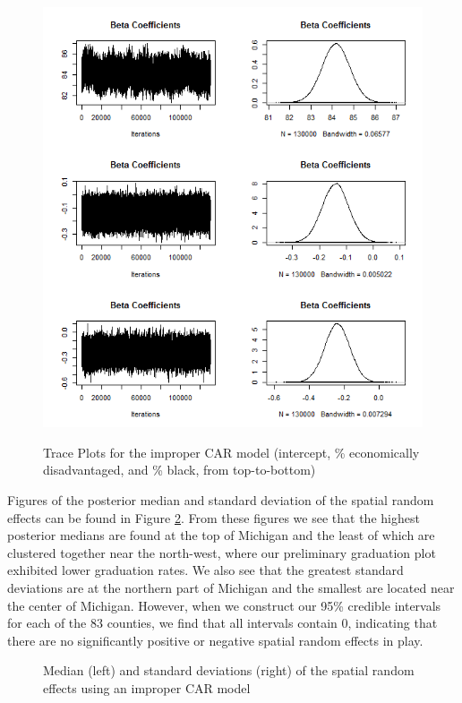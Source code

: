 \documentclass[12pt,letterpaper]{article}
\begin{document}
\begin{figure}[h!]
\caption{Trace Plots for the improper CAR model (intercept, \% economically disadvantaged, and \% black, from top-to-bottom)}
\centering
\includegraphics[scale=.9]{trace_plots.png}
\label{lab:trace_plots}
\end{figure}

Figures of the posterior median and standard deviation of the spatial random effects can be found in Figure \ref{lab:med_sd}. From these figures we see that the highest posterior medians are found at the top of Michigan and the least of which are clustered together near the north-west, where our preliminary graduation plot exhibited lower graduation rates. We also see that the greatest standard deviations are at the northern part of Michigan and the smallest are located near the center of Michigan. However, when we construct our 95\% credible intervals for each of the 83 counties, we find that all intervals contain 0, indicating that there are no significantly positive or negative spatial random effects in play.

\begin{figure}[h!]
\caption{Median (left) and standard deviations (right) of the spatial random effects using an improper CAR model}
\centering
\begin{minipage}{.5\textwidth}
  \centering
  \scalebox{.81}{
 \trimbox{1cm 2cm 0cm 0cm}{}
 }
\end{minipage}%
\begin{minipage}{.5\textwidth}
  \centering
  \scalebox{.81}{
 \trimbox{0cm 2cm -1cm 0cm}{}
 }
\end{minipage}

\label{lab:med_sd}
\end{figure}
\end{document}
